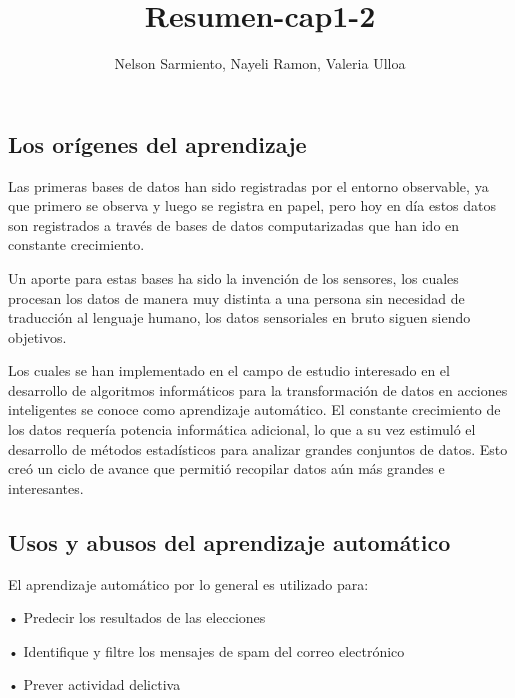 \documentclass[
  letterpaper,
  DIV=11,
  numbers=noendperiod]{scrartcl}
\title{Resumen-cap1-2}
\author{Nelson Sarmiento, Nayeli Ramon, Valeria Ulloa}
\date{}
\begin{document}
\maketitle
\ifdefined\Shaded\renewenvironment{Shaded}{\begin{tcolorbox}[breakable, interior hidden, enhanced, frame hidden, borderline west={3pt}{0pt}{shadecolor}, sharp corners, boxrule=0pt]}{\end{tcolorbox}}\fi

\hypertarget{los-oruxedgenes-del-aprendizaje}{%
\subsection{Los orígenes del
aprendizaje}\label{los-oruxedgenes-del-aprendizaje}}

Las primeras bases de datos han sido registradas por el entorno
observable, ya que primero se observa y luego se registra en papel, pero
hoy en día estos datos son registrados a través de bases de datos
computarizadas que han ido en constante crecimiento.

Un aporte para estas bases ha sido la invención de los sensores, los
cuales procesan los datos de manera muy distinta a una persona sin
necesidad de traducción al lenguaje humano, los datos sensoriales en
bruto siguen siendo objetivos.

Los cuales se han implementado en el campo de estudio interesado en el
desarrollo de algoritmos informáticos para la transformación de datos en
acciones inteligentes se conoce como aprendizaje automático. El
constante crecimiento de los datos requería potencia informática
adicional, lo que a su vez estimuló el desarrollo de métodos
estadísticos para analizar grandes conjuntos de datos. Esto creó un
ciclo de avance que permitió recopilar datos aún más grandes e
interesantes.

\hypertarget{usos-y-abusos-del-aprendizaje-automuxe1tico}{%
\subsection{Usos y abusos del aprendizaje
automático}\label{usos-y-abusos-del-aprendizaje-automuxe1tico}}

El aprendizaje automático por lo general es utilizado para:

• Predecir los resultados de las elecciones

• Identifique y filtre los mensajes de spam del correo electrónico

• Prever actividad delictiva
\end{document}
